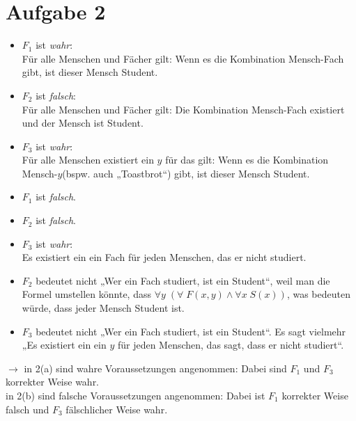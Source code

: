 \documentclass{scrreprt}
\begin{document}
\section{Aufgabe 2}
\begin{anumerate}
\item 
\begin{itemize}
\item $F_1$ ist \emph{wahr}:\\
Für alle Menschen und Fächer gilt: Wenn es die Kombination Mensch-Fach gibt, ist dieser Mensch Student.
\item $F_2$ ist \emph{falsch}:\\
Für alle Menschen und Fächer gilt: Die Kombination Mensch-Fach existiert und der Mensch ist Student.
\item $F_3$ ist \emph{wahr}:\\
Für alle Menschen existiert ein $y$ für das gilt: Wenn es die Kombination Mensch-$y$(bspw. auch „Toastbrot“) gibt, ist dieser Mensch Student.
\end{itemize}
\item 
\begin{itemize}
\item $F_1$ ist \emph{falsch}.
\item $F_2$ ist \emph{falsch}.
\item $F_3$ ist \emph{wahr}:\\
Es existiert ein ein Fach für jeden Menschen, das er nicht studiert.
\end{itemize}
\end{anumerate}
\begin{itemize}
\item $F_2$ bedeutet nicht „Wer ein Fach studiert, ist ein Student“, weil man die Formel umstellen könnte, dass $\forall y\; (\forall \;F(x,y) \wedge \forall x \;S(x))$, was bedeuten würde, dass jeder Mensch Student ist. 
\item $F_3$ bedeutet nicht „Wer ein Fach studiert, ist ein Student“. Es sagt vielmehr „Es existiert ein ein $y$ für jeden Menschen, das sagt, dass er nicht studiert“.
\end{itemize}
$\to$ in 2(a) sind wahre Voraussetzungen angenommen: Dabei sind $F_1$ und $F_3$ korrekter Weise wahr.\\
in 2(b) sind falsche Voraussetzungen angenommen: Dabei ist $F_1$ korrekter Weise falsch und $F_3$ fälschlicher Weise wahr.
\end{document}
